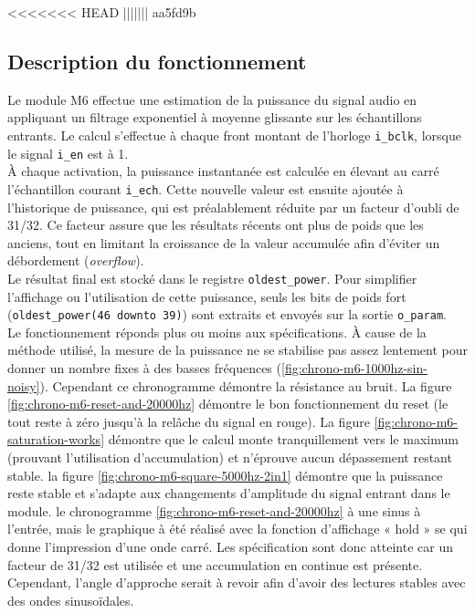 <<<<<<< HEAD
||||||| aa5fd9b


\subsection{Description du fonctionnement}

Le module M6 effectue une estimation de la puissance du signal audio en
appliquant un filtrage exponentiel à moyenne glissante sur les échantillons
entrants. Le calcul s'effectue à chaque front montant de l'horloge
\verb|i_bclk|, lorsque le signal \verb|i_en| est à 1. \\

À chaque activation, la puissance instantanée est calculée en élevant au
carré l'échantillon courant \verb|i_ech|. Cette nouvelle valeur est ensuite
ajoutée à l'historique de puissance, qui est préalablement réduite par un
facteur d'oubli de 31/32. Ce facteur assure que les résultats récents ont
plus de poids que les anciens, tout en limitant la croissance de la valeur
accumulée afin d'éviter un débordement (\emph{overflow}). \\

Le résultat final est stocké dans le registre \verb|oldest_power|. Pour
simplifier l'affichage ou l'utilisation de cette puissance, seuls les bits de
poids fort (\verb|oldest_power(46 downto 39)|) sont extraits et envoyés sur
la sortie \verb|o_param|. \\

Le fonctionnement réponds plus ou moins aux spécifications.
À cause de la méthode utilisé, la mesure de la puissance ne se stabilise pas assez lentement pour donner un nombre fixes
à des basses fréquences (\ref{fig:chrono-m6-1000hz-sin-noisy}). Cependant ce chronogramme démontre la résistance au bruit.
La figure \ref{fig:chrono-m6-reset-and-20000hz} démontre le bon fonctionnement du reset (le tout reste à zéro jusqu’à la relâche du signal en rouge).
La figure \ref{fig:chrono-m6-saturation-works} démontre que le calcul monte tranquillement vers le maximum (prouvant l'utilisation d'accumulation)
et n'éprouve aucun dépassement restant stable. la figure \ref{fig:chrono-m6-square-5000hz-2in1} démontre que la puissance reste stable et s'adapte
aux changements d'amplitude du signal entrant dans le module. le chronogramme \ref{fig:chrono-m6-reset-and-20000hz} à une sinus à l'entrée, mais le graphique
à été réalisé avec la fonction d'affichage « hold » se qui donne l'impression d'une onde carré. Les spécification sont
donc atteinte car un facteur de 31/32 est utilisée et une accumulation en continue est présente. Cependant, l'angle d'approche
serait à revoir afin d'avoir des lectures stables avec des ondes sinusoïdales.

